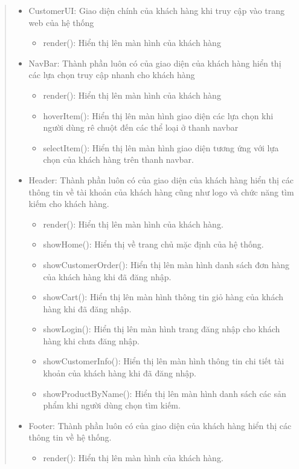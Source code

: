 \begin{quote}
	\begin{itemize}
		\item CustomerUI: Giao diện chính của khách hàng khi truy cập vào trang web của hệ thống
			\begin{itemize}
				\item render(): Hiển thị lên màn hình của khách hàng
			\end{itemize}
		\item NavBar: Thành phần luôn có của giao diện của khách hàng hiển thị các lựa chọn truy cập nhanh cho khách hàng
			\begin{itemize}
				\item render(): Hiển thị lên màn hình của khách hàng
				\item hoverItem(): Hiển thị lên màn hình giao diện các lựa chọn khi người dùng rê chuột đến các thể loại ở thanh navbar
				\item selectItem(): Hiển thị lên màn hình giao diện tương ứng với lựa chọn của khách hàng trên thanh navbar.
			\end{itemize}
		\item Header: Thành phần luôn có của giao diện của khách hàng hiển thị các thông tin về tài khoản của khách hàng cũng như logo và chức năng tìm kiếm cho khách hàng.
			\begin{itemize}
				\item render(): Hiển thị lên màn hình của khách hàng.
				\item showHome(): Hiển thị về trang chủ mặc định của hệ thống.
				\item showCustomerOrder(): Hiển thị lên màn hình danh sách đơn hàng của khách hàng khi đã đăng nhập.
				\item showCart(): Hiển thị lên màn hình thông tin giỏ hàng của khách hàng khi đã đăng nhập.
				\item showLogin(): Hiển thị lên màn hình trang đăng nhập cho khách hàng khi chưa đăng nhập.
				\item showCustomerInfo(): Hiển thị lên màn hình thông tin chi tiết tài khoản của khách hàng khi đã đăng nhập.
				\item showProductByName(): Hiển thị lên màn hình danh sách các sản phẩm khi người dùng chọn tìm kiếm.
			\end{itemize}
		\item Footer: Thành phần luôn có của giao diện của khách hàng hiển thị các thông tin về hệ thống.
			\begin{itemize}
				\item render(): Hiển thị lên màn hình của khách hàng.

\end{itemize}
\end{itemize}
\end{quote}
